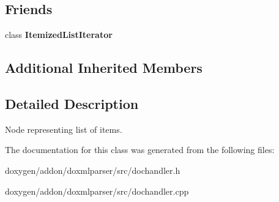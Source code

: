 \subsection*{Friends}
\begin{DoxyCompactItemize}
\item 
\mbox{\label{class_itemized_list_handler_a5a3b499fbbf2a34a8e8e167b74140467}} 
class {\bfseries Itemized\+List\+Iterator}
\end{DoxyCompactItemize}
\subsection*{Additional Inherited Members}


\subsection{Detailed Description}
Node representing list of items. 



The documentation for this class was generated from the following files\+:\begin{DoxyCompactItemize}
\item 
doxygen/addon/doxmlparser/src/dochandler.\+h\item 
doxygen/addon/doxmlparser/src/dochandler.\+cpp\end{DoxyCompactItemize}
